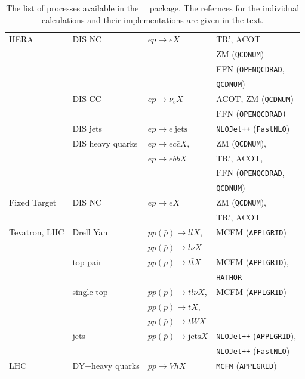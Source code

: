 \begin{table}
\begin{tabular}{|l|l|l|l|}
HERA &DIS NC   &$ep\to eX$      & TR', ACOT \\
     &         &                & ZM (\texttt{QCDNUM}) \\
     &         &                & FFN (\texttt{OPENQCDRAD}, \\
     &         &                & \texttt{QCDNUM}) \\
\hline
     &DIS CC   &$ep\to \nu_e X$ & ACOT, ZM (\texttt{QCDNUM}) \\
     &         &                & FFN (\texttt{OPENQCDRAD)} \\
\hline
     &DIS jets &$ep\to e\ \mathrm{jets}$      & \texttt{NLOJet++} (\texttt{FastNLO})\\
\hline
     &DIS heavy quarks & $ep\to e c \bar{c} X$, & ZM (\texttt{QCDNUM}), \\
     &         & $ep\to e b \bar{b} X$ & TR', ACOT, \\
     &         &                & FFN (\texttt{OPENQCDRAD}, \\
     &         &                & \texttt{QCDNUM}) \\
\hline
Fixed Target   &DIS NC          &$ep\to eX$ & ZM (\texttt{QCDNUM}), \\
     &         &                & TR', ACOT \\
\hline
Tevatron, LHC &Drell Yan &$pp(\bar p)\to l\bar l X$, & MCFM (\texttt{APPLGRID}) \\
              &          &$pp(\bar p)\to l\nu  X$ &                 \\
\hline
             &top pair   &$pp(\bar p) \to t\bar t X$  & MCFM (\texttt{APPLGRID}),  \\
              &            &                            & \texttt{HATHOR}            \\
\hline
             &single top &$pp(\bar p) \to t l \nu X$,      & MCFM (\texttt{APPLGRID}) \\
              &           &$pp(\bar p) \to tX$,             &  \\
              &           &$pp(\bar p) \to tWX$             &  \\
\hline
             &jets &$pp(\bar p) \to \mathrm{jets} X$ & \texttt{NLOJet++} (\texttt{APPLGRID}), \\
                &  & & \texttt{NLOJet++} (\texttt{FastNLO}) \\
\hline
LHC& DY+heavy quarks &$pp \to VhX$ & \texttt{MCFM} (\texttt{APPLGRID}) \\
\hline
\end{tabular}
\caption{The list of processes available in the \fitter\ ~package. 
The refernces for the individual calculations and their implementations are given in the text.
}
\label{tab:proc}
\end{table}
